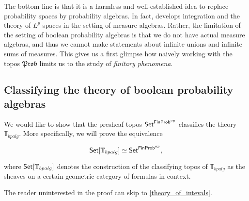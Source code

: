 \documentclass[a4paper]{amsproc}
\theoremstyle{plain}
\theoremstyle{definition}
\theoremstyle{remark}
\numberwithin{equation}{section}
\newcommand{\Set}{\textup{\textsf{Set}}}
\newcommand{\FinProb}{\textup{\textsf{FinProb}}}
\newcommand{\Prob}{\mathfrak{Prob}}
\begin{document}
The bottom line is that it is a harmless and well-established idea to replace probability spaces by probability algebras. In fact, \cite{fremlin2012measure} develops integration and the theory of $L^p$ spaces in the setting of measure algebras. Rather, the limitation of the setting of boolean probability algebras is that we do not have actual measure algebras, and thus we cannot make statements about infinite unions and infinite sums of measures. This gives us a first glimpse how naively working with the topos $\Prob$ limits us to the study of \emph{finitary phenomena}.

\subsection{Classifying the theory of boolean probability algebras}

We would like to show that the presheaf topos \newline $\Set^{\FinProb^{op}}$ classifies the theory $\mathbb{T}_{bpalg}$. More specifically, we will prove the equivalence

\begin{equation}\label{equiv}
    \Set[\mathbb{T}_{bpalg}] \simeq \Set^{\FinProb^{op}} ,
\end{equation}

where $\Set[\mathbb{T}_{bpalg}]$ denotes the construction of the classifying topos of $\mathbb{T}_{bpalg}$ as the sheaves on a certain geometric category of formulas in context.

The reader uninterested in the proof can skip to \ref{theory_of_intevals}.
\end{document}
